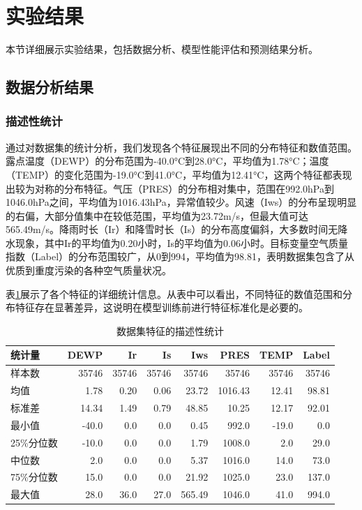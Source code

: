 \section{实验结果}

本节详细展示实验结果，包括数据分析、模型性能评估和预测结果分析。

\subsection{数据分析结果}
\subsubsection{描述性统计}
通过对数据集的统计分析，我们发现各个特征展现出不同的分布特征和数值范围。露点温度（DEWP）的分布范围为-40.0°C到28.0°C，平均值为1.78°C；温度（TEMP）的变化范围为-19.0°C到41.0°C，平均值为12.41°C，这两个特征都表现出较为对称的分布特征。气压（PRES）的分布相对集中，范围在992.0hPa到1046.0hPa之间，平均值为1016.43hPa，异常值较少。风速（Iws）的分布呈现明显的右偏，大部分值集中在较低范围，平均值为23.72m/s，但最大值可达565.49m/s。降雨时长（Ir）和降雪时长（Is）的分布高度偏斜，大多数时间无降水现象，其中Ir的平均值为0.20小时，Is的平均值为0.06小时。目标变量空气质量指数（Label）的分布范围较广，从0到994，平均值为98.81，表明数据集包含了从优质到重度污染的各种空气质量状况。

表\ref{tab:descriptive_stats}展示了各个特征的详细统计信息。从表中可以看出，不同特征的数值范围和分布特征存在显著差异，这说明在模型训练前进行特征标准化是必要的。

\begin{table}[H]
    \centering
    \small
    \begin{tabular}{lrrrrrrr}
        \toprule
        统计量 & DEWP & Ir & Is & Iws & PRES & TEMP & Label \\
        \midrule
        样本数 & 35746 & 35746 & 35746 & 35746 & 35746 & 35746 & 35746 \\
        均值 & 1.78 & 0.20 & 0.06 & 23.72 & 1016.43 & 12.41 & 98.81 \\
        标准差 & 14.34 & 1.49 & 0.79 & 48.85 & 10.25 & 12.17 & 92.01 \\
        最小值 & -40.0 & 0.0 & 0.0 & 0.45 & 992.0 & -19.0 & 0.0 \\
        25\%分位数 & -10.0 & 0.0 & 0.0 & 1.79 & 1008.0 & 2.0 & 29.0 \\
        中位数 & 2.0 & 0.0 & 0.0 & 5.37 & 1016.0 & 14.0 & 73.0 \\
        75\%分位数 & 15.0 & 0.0 & 0.0 & 21.92 & 1025.0 & 23.0 & 137.0 \\
        最大值 & 28.0 & 36.0 & 27.0 & 565.49 & 1046.0 & 41.0 & 994.0 \\
        \bottomrule
    \end{tabular}
    \caption{数据集特征的描述性统计}
    \label{tab:descriptive_stats}
\end{table}

